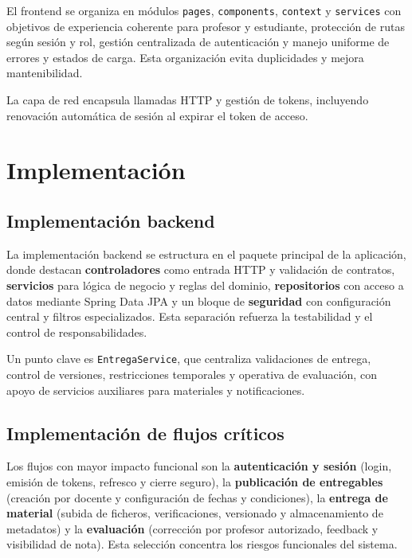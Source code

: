 El frontend se organiza en m\'odulos \texttt{pages}, \texttt{components}, \texttt{context} y \texttt{services} con objetivos de experiencia coherente para profesor y estudiante, protecci\'on de rutas seg\'un sesi\'on y rol, gesti\'on centralizada de autenticaci\'on y manejo uniforme de errores y estados de carga. Esta organizaci\'on evita duplicidades y mejora mantenibilidad.

La capa de red encapsula llamadas HTTP y gesti\'on de tokens,
incluyendo renovaci\'on autom\'atica de sesi\'on al expirar el token de acceso.

\FloatBarrier
\section{Implementaci\'on}

\subsection{Implementaci\'on backend}

La implementaci\'on backend se estructura en el paquete principal de la aplicaci\'on, donde destacan \textbf{controladores} como entrada HTTP y validaci\'on de contratos, \textbf{servicios} para l\'ogica de negocio y reglas del dominio, \textbf{repositorios} con acceso a datos mediante Spring Data JPA y un bloque de \textbf{seguridad} con configuraci\'on central y filtros especializados. Esta separaci\'on refuerza la testabilidad y el control de responsabilidades.

Un punto clave es \texttt{EntregaService}, que centraliza validaciones de entrega,
control de versiones, restricciones temporales y operativa de evaluaci\'on,
con apoyo de servicios auxiliares para materiales y notificaciones.

\subsection{Implementaci\'on de flujos cr\'iticos}

Los flujos con mayor impacto funcional son la \textbf{autenticaci\'on y sesi\'on} (login, emisi\'on de tokens, refresco y cierre seguro), la \textbf{publicaci\'on de entregables} (creaci\'on por docente y configuraci\'on de fechas y condiciones), la \textbf{entrega de material} (subida de ficheros, verificaciones, versionado y almacenamiento de metadatos) y la \textbf{evaluaci\'on} (correcci\'on por profesor autorizado, feedback y visibilidad de nota). Esta selecci\'on concentra los riesgos funcionales del sistema.

